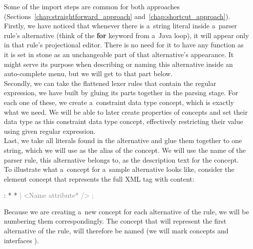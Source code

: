 Some of the import steps are common for both approaches (Sections~\ref{chap:straightforward_approach} and~\ref{chap:shortcut_approach}).
\\

Firstly, we have noticed that whenever there is a~string literal inside a~parser rule's alternative (think of the \textbf{for} keyword from a~Java loop), it will appear only in that rule's projectional editor.
There is no need for it to have any function as it is set in stone as an unchangeable part of that alternative's appearance.
It might serve its purpose when describing or naming this alternative inside an auto-complete menu, but we will get to that part below.
\\

Secondly, we can take the flattened lexer rules that contain the regular expression, we have built by gluing its parts together in the parsing stage.
For each one of these, we create a~constraint data type concept, which is exactly what we need.
We will be able to later create properties of concepts and set their data type as this constraint data type concept, effectively restricting their value using given regular expression.
\\

Last, we take all literals found in the alternative and glue them together to one string, which we will use as the alias of the concept.
We will use the name of the parser rule, this alternative belongs to, as the description text for the concept.
\\

To illustrate what a~concept for a~sample alternative looks like, consider the element concept that represents the full XML tag with content:

\begin{antlr}
	      :   \literal{<}  * \literal{>} * \literal{</}  \literal{>}
             \textcolor{gray}{|   \ap<\ap Name attribute* \ap/>\ap}
             \textcolor{gray}{;}
\end{antlr}

Because we are creating a~new concept for each alternative of the rule, we will be numbering them correspondingly.
The concept that will represent the first alternative of the  rule, will therefore be named 
(we will mark concepts  and interfaces ).

